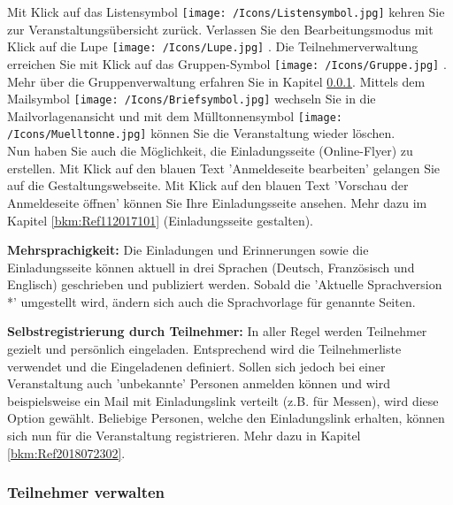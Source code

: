 Mit Klick auf das Listensymbol \texttt{[image: /Icons/Listensymbol.jpg]}  kehren Sie zur Veranstaltungsübersicht zurück. Verlassen Sie den Bearbeitungsmodus mit Klick auf die Lupe \texttt{[image: /Icons/Lupe.jpg]} . Die Teilnehmerverwaltung erreichen Sie mit Klick auf das Gruppen-Symbol \texttt{[image: /Icons/Gruppe.jpg]} . Mehr über die Gruppenverwaltung erfahren Sie in Kapitel \ref{bkm:Ref112017102}. Mittels dem Mailsymbol \texttt{[image: /Icons/Briefsymbol.jpg]}  wechseln Sie in die Mailvorlagenansicht und mit dem Mülltonnensymbol \texttt{[image: /Icons/Muelltonne.jpg]}  können Sie die Veranstaltung wieder löschen.\\
Nun haben Sie auch die Möglichkeit, die Einladungsseite (Online-Flyer) zu erstellen. Mit Klick auf den blauen Text 'Anmeldeseite bearbeiten'  gelangen Sie auf die Gestaltungswebseite. Mit Klick auf den blauen Text 'Vorschau der Anmeldeseite öffnen'  können Sie Ihre Einladungsseite ansehen. Mehr dazu im Kapitel \ref{bkm:Ref112017101} (Einladungsseite gestalten).

\vspace{\baselineskip}

\textbf{Mehrsprachigkeit:} Die Einladungen und Erinnerungen sowie die Einladungsseite können aktuell in drei Sprachen (Deutsch, Französisch und Englisch) geschrieben und publiziert werden. Sobald die 'Aktuelle Sprachversion *' umgestellt wird, ändern sich auch die Sprachvorlage für genannte Seiten. 

\vspace{\baselineskip}

\textbf{Selbstregistrierung durch Teilnehmer:} In aller Regel werden Teilnehmer gezielt und persönlich eingeladen. Entsprechend wird die Teilnehmerliste verwendet und die Eingeladenen definiert. Sollen sich jedoch bei einer Veranstaltung auch 'unbekannte' Personen anmelden können und wird beispielsweise ein Mail mit Einladungslink verteilt  (z.B. für Messen), wird diese Option gewählt. Beliebige Personen, welche den Einladungslink erhalten, können sich nun für die Veranstaltung registrieren. Mehr dazu in Kapitel \ref{bkm:Ref2018072302}.

\subsubsection{Teilnehmer verwalten}
\label{bkm:Ref112017102}

